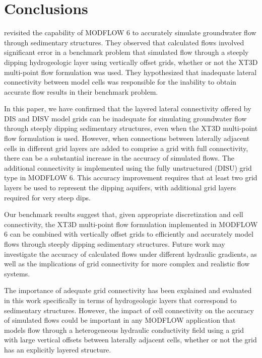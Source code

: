 \documentclass{article}
\begin{document}
\section{Conclusions}

\cite{bardot2023} revisited the capability of MODFLOW 6 to accurately simulate groundwater flow through sedimentary structures. They observed that calculated flows involved significant error in a benchmark problem that simulated flow through a steeply dipping hydrogeologic layer using vertically offset grids, whether or not the XT3D multi-point flow formulation was used. They hypothesized that inadequate lateral connectivity between model cells was responsible for the inability to obtain accurate flow results in their benchmark problem.

In this paper, we have confirmed that the layered lateral connectivity offered by DIS and DISV model grids can be inadequate for simulating groundwater flow through steeply dipping sedimentary structures, even when the XT3D multi-point flow formulation is used.  However, when connections between laterally adjacent cells in different grid layers are added to comprise a grid with full connectivity, there can be a substantial increase in the accuracy of simulated flows.  The additional connectivity is implemented using the fully unstructured (DISU) grid type in MODFLOW 6. This accuracy improvement requires that at least two grid layers be used to represent the dipping aquifers, with additional grid layers required for very steep dips.

Our benchmark results suggest that, given appropriate discretization and cell connectivity, the XT3D multi-point flow formulation implemented in MODFLOW 6 can be combined with vertically offset grids to efficiently and accurately model flows through steeply dipping sedimentary structures. Future work may investigate the accuracy of calculated flows under different hydraulic gradients, as well as the implications of grid connectivity for more complex and realistic flow systems.

The importance of adequate grid connectivity has been explained and evaluated in this work specifically in terms of hydrogeologic layers that correspond to sedimentary structures. However, the impact of cell connectivity on the accuracy of simulated flows could be important in any MODFLOW application that models flow through a heterogeneous hydraulic conductivity field using a grid with large vertical offsets between laterally adjacent cells, whether or not the grid has an explicitly layered structure.
\end{document}
